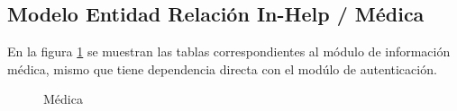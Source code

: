 \subsection{Modelo Entidad Relación In-Help / Médica}
En la figura \ref{fig:BD_Medica} se muestran las tablas correspondientes al módulo de información médica, mismo que tiene dependencia directa con el modúlo de autenticación.
\begin{figure}[htbp!]
	\centering
	\caption{Médica}
	\label{fig:BD_Medica}
\end{figure}
